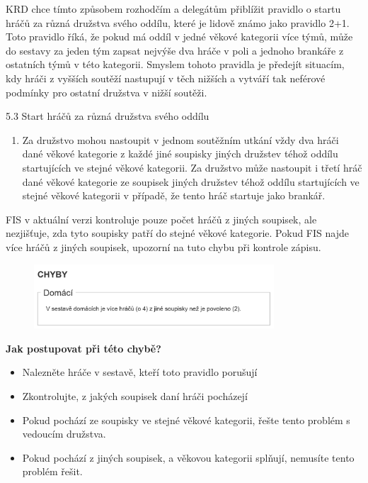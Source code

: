 \documentclass{newsletter}
\begin{document}
\clearpage
{}
KRD chce tímto způsobem rozhodčím a delegátům přiblížit pravidlo o startu hráčů za různá družstva svého oddílu, které je lidově známo jako pravidlo 2+1. Toto pravidlo říká, že pokud má oddíl v jedné věkové kategorii více týmů, může do sestavy za jeden tým zapsat nejvýše dva hráče v poli a jednoho brankáře z ostatních týmů v této kategorii. Smyslem tohoto pravidla je předejít situacím, kdy hráči z vyšších soutěží nastupují v těch nižších a vytváří tak neférové podmínky pro ostatní družstva v nižší soutěži.

\begin{admonition-quote}{5.3 Start hráčů za různá družstva svého oddílu}
	\begingroup
	\renewcommand{\theenumi}{\alph{enumi}}
	\begin{enumerate}\addtocounter{enumi}{2}
		\item Za družstvo mohou nastoupit v jednom soutěžním utkání vždy dva hráči dané věkové
		kategorie z každé jiné soupisky jiných družstev téhož oddílu startujících ve stejné
		věkové kategorii. Za družstvo může nastoupit i třetí hráč dané věkové kategorie ze
		soupisek jiných družstev téhož oddílu startujících ve stejné věkové kategorii v případě,
		že tento hráč startuje jako brankář.
	\end{enumerate}
	\endgroup
\end{admonition-quote}

FIS v aktuální verzi kontroluje pouze počet hráčů z jiných soupisek, ale nezjišťuje, zda tyto soupisky patří do stejné věkové kategorie. Pokud FIS najde více hráčů z jiných soupisek, upozorní na tuto chybu při kontrole zápisu.

\begin{figure}[h]
	\centering
	\includegraphics[width=0.8\textwidth]{chyba_pravidlo_2_1}\linebreak
	{\small{}}
\end{figure}

\textbf{Jak postupovat při této chybě?}
\begin{itemize}
	\item Nalezněte hráče v sestavě, kteří toto pravidlo porušují
	\item Zkontrolujte, z jakých soupisek daní hráči pocházejí
	\item Pokud pochází ze soupisky ve stejné věkové kategorii, řešte tento problém s vedoucím družstva.
	\item Pokud pochází z jiných soupisek, a věkovou kategorii splňují, nemusíte tento problém řešit.
\end{itemize}
\end{document}
